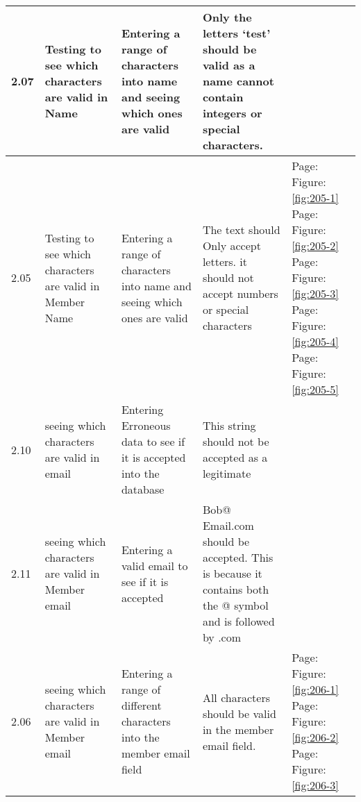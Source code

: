 \begin{flushleft}
\begin{longtable}{|p{1cm}|p{2.5cm}|p{2.5cm}|p{2cm}|p{2cm}|}
	\rowcolor{dark-grey}2.07 & Testing to see which characters are valid in Name & Entering a range of characters into name and seeing which ones are valid  & Only the letters `test' should be valid as a name cannot contain integers or special characters.& \\ \hline
	2.05 & Testing to see which characters are valid in Member Name & Entering a range of characters into name and seeing which ones are valid &  The text should Only accept letters. it should not accept numbers or special characters& Page:\pageref{fig:205-1}  \newline Figure:\ref{fig:205-1} \newline  \newline Page:\pageref{fig:205-2}  \newline Figure:\ref{fig:205-2}  \newline  \newline Page:\pageref{fig:205-3}  \newline Figure:\ref{fig:205-3} \newline  \newline Page:\pageref{fig:205-4}  \newline Figure:\ref{fig:205-4}  \newline  \newline   Page:\pageref{fig:205-5}  \newline Figure:\ref{fig:205-5} \\ \hline
	\rowcolor{dark-grey}2.10 & seeing which characters are valid in email & Entering Erroneous data to see if it is accepted into the database  & This string should not be accepted as a legitimate & \\ \hline
	\rowcolor{dark-grey}2.11 & seeing which characters are valid in Member email & Entering a valid email to see if it is accepted  &  Bob@ Email.com should be accepted. This is because it contains both the @ symbol and is followed by .com & \\ \hline
	\rowcolor{light-grey}2.06 & seeing which characters are valid in Member email & Entering a range of different characters into the member email field &  All characters should be valid in the member email field. &  Page:\pageref{fig:206-1}  \newline Figure:\ref{fig:206-1} \newline  \newline Page:\pageref{fig:206-2}  \newline Figure:\ref{fig:206-2} \newline  \newline  Page:\pageref{fig:206-3}  \newline Figure:\ref{fig:206-3} \\ \hline

\end{longtable}
\end{flushleft}
